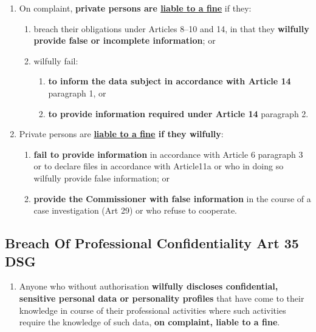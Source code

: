 \documentclass[11pt]{article}
\theoremstyle{definition}
\begin{document}
\begin{enumerate}[label=\arabic*]
	\item On complaint, \textbf{private persons are \underline{liable to a fine}} if they:
	\begin{enumerate}[label=\alph*.]
		\item breach their obligations under Articles 8–10 and 14, in that they \textbf{wilfully provide false or incomplete information}; or
		\item wilfully fail:
		\begin{enumerate}[label=\arabic*.]
			\item \textbf{to inform the data subject in accordance with Article 14} paragraph 1, or
			\item \textbf{to provide information required under Article 14} paragraph 2.
		\end{enumerate}
	\end{enumerate}
	\item Private persons are \textbf{\underline{liable to a fine} if they wilfully}:
		\begin{enumerate}[label=\alph*.]
			\item \textbf{fail to provide information} in accordance with Article 6 paragraph 3 or to declare files in accordance with Article11a or who in doing so wilfully provide false information; or
			\item \textbf{provide the Commissioner with false information} in the course of a case investigation (Art 29) or who refuse to cooperate.
	\end{enumerate}
\end{enumerate}

\subsection{Breach Of Professional Confidentiality Art 35 DSG}
\begin{enumerate}[label=\arabic*]
	\item Anyone who without authorisation \textbf{wilfully discloses confidential, sensitive personal data or personality profiles} that have come to their knowledge in course of their professional activities where such activities require the knowledge of such data, \textbf{on complaint, liable to a fine}.
\end{enumerate}
\end{document}
